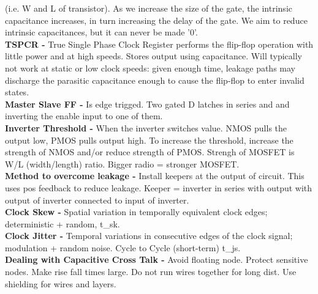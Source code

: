 \documentclass[9pt,fleqn]{article}
\begin{document}
\begin{multicols}{3}
    (i.e. W and L of transistor).  As we increase the size of the gate, the
    intrinsic capacitance increases, in turn increasing the delay of the gate.
    We aim to reduce intrinsic capacitances, but it can never be made '0'.\\
    \textbf{TSPCR -} True Single Phase Clock Register performs the flip-flop
    operation with little power and at high speeds. Stores output using
    capacitance. Will typically not work at static or low clock speeds: given
    enough time, leakage paths may discharge the parasitic capacitance enough
    to cause the flip-flop to enter invalid states.\\
    \textbf{Master Slave FF -} Is edge trigged. Two gated D latches in series
    and and inverting the enable input to one of them.\\
    \textbf{Inverter Threshold -} When the inverter switches value. NMOS pulls
    the output low, PMOS pulls output high. To increase the threshold,
    increase the strength of NMOS and/or reduce strength of PMOS. Strengh of
    MOSFET is W/L (width/length) ratio. Bigger radio = stronger MOSFET.\\
    \textbf{Method to overcome leakage -} Install keepers at the output of
    circuit. This uses pos feedback to reduce leakage. Keeper = inverter in
    series with output with output of inverter connected to input of inverter.\\
    \textbf{Clock Skew -} Spatial variation in temporally equivalent clock
    edges; deterministic + random, t\_sk. \\
    \textbf{Clock Jitter -} Temporal variations in consecutive edges of the
    clock signal; modulation + random noise. Cycle to Cycle (short-term) t\_js.\\
    \textbf{Dealing with Capacitive Cross Talk -} Avoid floating node. Protect
    sensitive nodes. Make rise fall times large. Do not run wires together for
    long dist. Use shielding for wires and layers.



\end{multicols}
\end{document}
